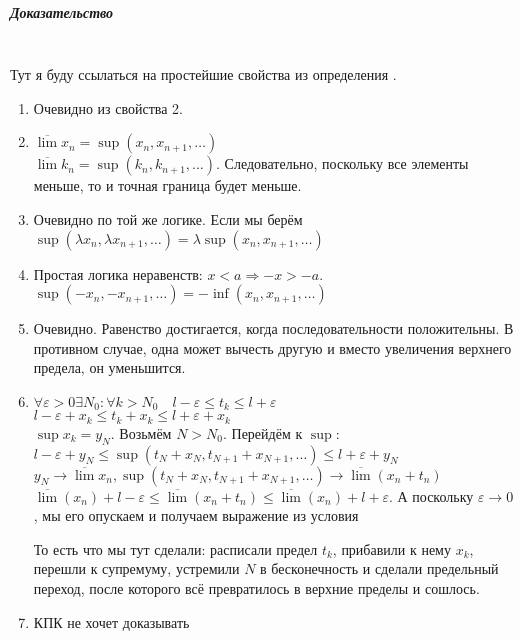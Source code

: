 \documentclass{article}
\let\vanillasubparagraph\subparagraph
\renewcommand{\subparagraph}[1]{\vanillasubparagraph{#1}\mbox{}\\}
\begin{document}
\subparagraph{Доказательство}
Тут я буду ссылаться на простейшие свойства из определения .
\begin{enumerate}
    \item Очевидно из свойства 2.
    
    \item $\overline{\lim} x_n = \sup(x_n, x_{n+1}, \ldots)$\\
    $\overline{\lim} k_n = \sup(k_n, k_{n+1}, \ldots)$. Следовательно, поскольку все элементы меньше, то и точная граница будет меньше. 
    
    \item Очевидно по той же логике. Если мы берём $\sup(\lambda x_n, \lambda x_{n+1}, \ldots) = \lambda \sup(x_n, x_{n+1}, \ldots)$
    
    \item Простая логика неравенств: $x < a \Rightarrow -x > -a$. $\sup(-x_n, -x_{n+1}, \ldots) = -\inf(x_n, x_{n+1}, \ldots)$
    
    \item Очевидно. Равенство достигается, когда последовательности положительны. В противном случае, одна может вычесть другую и вместо увеличения верхнего предела, он уменьшится.
    
    \item $\forall \varepsilon > 0 \exists N_0 : \forall k > N_0 \quad l - \varepsilon \le t_k \le l + \varepsilon$\\
    $l - \varepsilon + x_k \le t_k + x_k \le l + \varepsilon + x_k$\\
    $\sup x_k = y_N$. Возьмём $N > N_0$. Перейдём к $\sup$: $l - \varepsilon + y_N \le \sup(t_N + x_N, t_{N+1} + x_{N+1}, \ldots) \le l + \varepsilon + y_N$\\
    $y_N \rightarrow \overline{\lim}x_n, \sup(t_N + x_N, t_{N+1} + x_{N+1}, \ldots) \rightarrow \overline{\lim} (x_n + t_n)$\\
    $\overline{\lim}(x_n) + l - \varepsilon \le \overline{\lim} (x_n + t_n) \le \overline{\lim} (x_n) + l + \varepsilon$. А поскольку $\varepsilon \rightarrow 0$, мы его опускаем и получаем выражение из условия
    
    То есть что мы тут сделали: расписали предел $t_k$, прибавили к нему $x_k$, перешли к супремуму, устремили $N$ в бесконечность и сделали предельный переход, после которого всё превратилось в верхние пределы и сошлось.
    
    \item КПК не хочет доказывать \Smiley
\end{enumerate}
\end{document}
